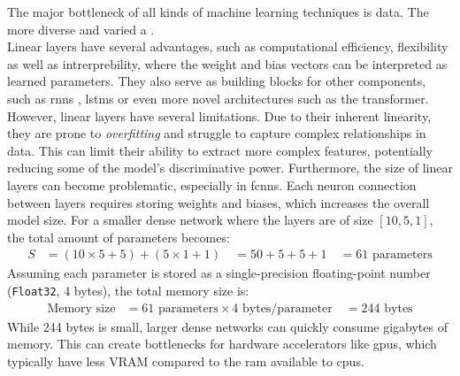 The major bottleneck of all kinds of machine learning techniques is data. The more diverse and varied a . \\

Linear layers have several advantages, such as computational efficiency, flexibility as well as intrerprebility, where the weight and bias vectors can be interpreted as learned parameters. They also serve as building blocks for other components, such as \acrshort{rnn}s \cite{schmidt2019recurrent}, \acrshort{lstm}s \cite{lstm} or even more novel architectures such as the transformer\cite{vaswani2017attention}. \\ 

However, linear layers have several limitations. Due to their inherent linearity, they are prone to \textit{overfitting} and struggle to capture complex relationships in data. This can limit their ability to extract more complex features, potentially reducing some of the model's discriminative power. Furthermore, the size of linear layers can become problematic, especially in \acrshort{fcnn}s. Each neuron connection between layers requires storing weights and biases, which increases the overall model size. For a smaller dense network where the layers are of size $[10, 5, 1]$, the total amount of parameters becomes:
$$\begin{aligned}
S &= (10 \times 5 + 5) + (5 \times 1 + 1) \
&= 50 + 5 + 5 + 1 \
&= 61 \text{ parameters}
\end{aligned}$$
Assuming each parameter is stored as a single-precision floating-point number (\texttt{Float32}, 4 bytes), the total memory size is:
$$\begin{aligned}
\text{Memory size} &= 61 \text{ parameters} \times 4 \text{ bytes/parameter} \
&= 244 \text{ bytes}
\end{aligned}$$ While 244 bytes is small, larger dense networks can quickly consume gigabytes of memory. This can create bottlenecks for hardware accelerators like \acrshort{gpu}s, which typically have less VRAM compared to the \acrshort{ram} available to \acrshort{cpu}s.